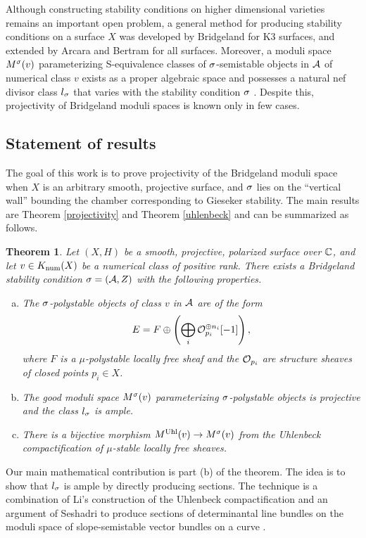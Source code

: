 \documentclass[letterpaper,12pt]{amsart}
\newtheorem{thm}{Theorem}[section]
\theoremstyle{remark}
\begin{document}
Although constructing stability conditions on higher dimensional varieties remains an important open problem, a general method for producing stability conditions on a surface $X$ was developed by Bridgeland \cite{bridgelandK3} for K3 surfaces, and extended by Arcara and Bertram \cite{ABL13} for all surfaces. Moreover, a moduli space $M^\sigma(v)$ parameterizing S-equivalence classes of $\sigma$-semistable objects in $\mathcal{A}$ of numerical class $v$ exists as a proper algebraic space \cite[Theorem 7.25, Example 7.27]{AHLH} and possesses a natural nef divisor class $l_\sigma$ that varies with the stability condition $\sigma$ \cite{BM}. Despite this, projectivity of Bridgeland moduli spaces is known only in few cases.

\subsection*{Statement of results}

The goal of this work is to prove projectivity of the Bridgeland moduli space when $X$ is an arbitrary smooth, projective surface, and $\sigma$ lies on the ``vertical wall'' bounding the chamber corresponding to Gieseker stability. The main results are Theorem \ref{projectivity} and Theorem \ref{uhlenbeck} and can be summarized as follows.
\begin{thm}
    Let $(X,H)$ be a smooth, projective, polarized surface over $\mathbb{C}$, and let $v \in K_{\mathrm{num}}(X)$ be a numerical class of positive rank. There exists a Bridgeland stability condition $\sigma = (\mathcal{A}, Z)$ with the following properties.
    \begin{enumerate}[(a)]
        \item The $\sigma$-polystable objects of class $v$ in $\mathcal{A}$ are of the form
        \[ E = F \oplus \left(\bigoplus_i \mathcal{O}_{p_i}^{\oplus n_i} [-1]\right), \]
        where $F$ is a $\mu$-polystable locally free sheaf and the $\mathcal{O}_{p_i}$ are structure sheaves of closed points $p_i \in X$.
        \item The good moduli space $M^\sigma(v)$ parameterizing $\sigma$-polystable objects is projective and the class $l_\sigma$ is ample.
        \item There is a bijective morphism $M^{\mathrm{Uhl}}(v) \to M^\sigma(v)$ from the Uhlenbeck compactification of $\mu$-stable locally free sheaves.
    \end{enumerate}
\end{thm}
Our main mathematical contribution is part (b) of the theorem. The idea is to show that $l_\sigma$ is ample by directly producing sections. The technique is a combination of Li's construction of the Uhlenbeck compactification and an argument of Seshadri to produce sections of determinantal line bundles on the moduli space of slope-semistable vector bundles on a curve \cite{seshadri}.
\end{document}
